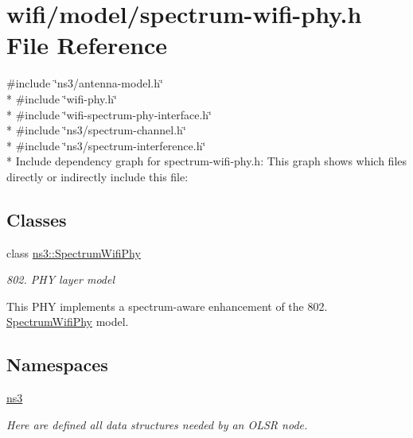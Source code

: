 \hypertarget{spectrum-wifi-phy_8h}{}\section{wifi/model/spectrum-\/wifi-\/phy.h File Reference}
\label{spectrum-wifi-phy_8h}
{\ttfamily \#include \char`\"{}ns3/antenna-\/model.\+h\char`\"{}}\\*
{\ttfamily \#include \char`\"{}wifi-\/phy.\+h\char`\"{}}\\*
{\ttfamily \#include \char`\"{}wifi-\/spectrum-\/phy-\/interface.\+h\char`\"{}}\\*
{\ttfamily \#include \char`\"{}ns3/spectrum-\/channel.\+h\char`\"{}}\\*
{\ttfamily \#include \char`\"{}ns3/spectrum-\/interference.\+h\char`\"{}}\\*
Include dependency graph for spectrum-\/wifi-\/phy.h\+:
This graph shows which files directly or indirectly include this file\+:
\subsection*{Classes}
\begin{DoxyCompactItemize}
\item 
class \hyperlink{classns3_1_1SpectrumWifiPhy}{ns3\+::\+Spectrum\+Wifi\+Phy}
\begin{DoxyCompactList}\small\item\em 802. P\+HY layer model

This P\+HY implements a spectrum-\/aware enhancement of the 802. \hyperlink{classns3_1_1SpectrumWifiPhy}{Spectrum\+Wifi\+Phy} model. \end{DoxyCompactList}\end{DoxyCompactItemize}
\subsection*{Namespaces}
\begin{DoxyCompactItemize}
\item 
 \hyperlink{namespacens3}{ns3}
\begin{DoxyCompactList}\small\item\em Here are defined all data structures needed by an O\+L\+SR node. \end{DoxyCompactList}\end{DoxyCompactItemize}
